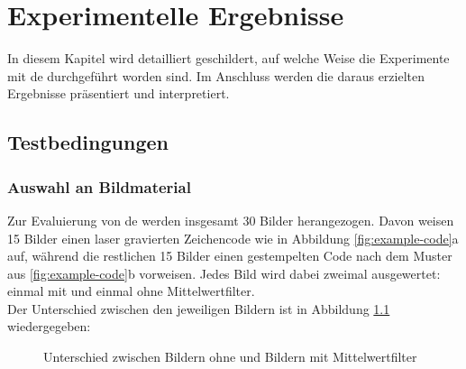 \chapter{Experimentelle Ergebnisse}
\label{chap:results}
	In diesem Kapitel wird detailliert geschildert, auf welche Weise die Experimente mit \gls{de} durchgeführt worden sind. Im Anschluss werden die daraus erzielten Ergebnisse präsentiert und interpretiert.
	
	\section{Testbedingungen}
	\label{sec:execution}
	
		\subsection{Auswahl an Bildmaterial}
		\label{sub:choice-of-images}
			Zur Evaluierung von \gls{de} werden insgesamt 30 Bilder herangezogen. Davon weisen 15 Bilder einen laser gravierten Zeichencode wie in Abbildung \ref{fig:example-code}a auf, während die restlichen 15 Bilder einen gestempelten Code nach dem Muster aus \ref{fig:example-code}b vorweisen. Jedes Bild wird dabei zweimal ausgewertet: einmal mit und einmal ohne Mittelwertfilter.\\
			Der Unterschied zwischen den jeweiligen Bildern ist in Abbildung \ref{fig:filter} wiedergegeben:
			\begin{figure}[H]
				\centering
				\quad
				
				\quad
				\caption{Unterschied zwischen Bildern ohne und Bildern mit Mittelwertfilter}
				\label{fig:filter}
			\end{figure}
	
